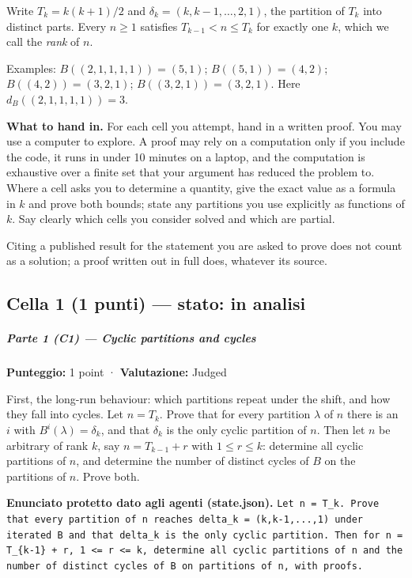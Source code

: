 \documentclass[11pt,a4paper]{article}
\begin{document}
Write \(T_k = k(k+1)/2\) and \(\delta_k = (k, k-1, \ldots, 2, 1)\), the
partition of \(T_k\) into distinct parts. Every \(n \ge 1\) satisfies
\(T_{k-1} < n \le T_k\) for exactly one \(k\), which we call the
\emph{rank} of \(n\).

Examples: \(B((2,1,1,1,1)) = (5,1)\); \(B((5,1)) = (4,2)\);
\(B((4,2)) = (3,2,1)\); \(B((3,2,1)) = (3,2,1)\). Here
\(d_B((2,1,1,1,1)) = 3\).

\textbf{What to hand in.} For each cell you attempt, hand in a written
proof. You may use a computer to explore. A proof may rely on a
computation only if you include the code, it runs in under 10 minutes on
a laptop, and the computation is exhaustive over a finite set that your
argument has reduced the problem to. Where a cell asks you to determine
a quantity, give the exact value as a formula in \(k\) and prove both
bounds; state any partitions you use explicitly as functions of \(k\).
Say clearly which cells you consider solved and which are partial.

Citing a published result for the statement you are asked to prove does
not count as a solution; a proof written out in full does, whatever its
source.

\subsection{Cella 1 (1 punti) — stato: in analisi}
\subparagraph{Parte 1 (C1) --- Cyclic partitions and
cycles}\label{parte-1-c1-cyclic-partitions-and-cycles}

\textbf{Punteggio:} 1 point · \textbf{Valutazione:} Judged

First, the long-run behaviour: which partitions repeat under the shift,
and how they fall into cycles. Let \(n = T_k\). Prove that for every
partition \(\lambda\) of \(n\) there is an \(i\) with
\(B^i(\lambda) = \delta_k\), and that \(\delta_k\) is the only cyclic
partition of \(n\). Then let \(n\) be arbitrary of rank \(k\), say
\(n = T_{k-1} + r\) with \(1 \le r \le k\): determine all cyclic
partitions of \(n\), and determine the number of distinct cycles of
\(B\) on the partitions of \(n\). Prove both.

\textbf{Enunciato protetto dato agli agenti (state.json).} \texttt{Let n = T\_k. Prove that every partition of n reaches delta\_k = (k,k-1,...,1) under iterated B and that delta\_k is the only cyclic partition. Then for n = T\_\{k-1\} + r, 1 \textless{}= r \textless{}= k, determine all cyclic partitions of n and the number of distinct cycles of B on partitions of n, with proofs.}
\end{document}
